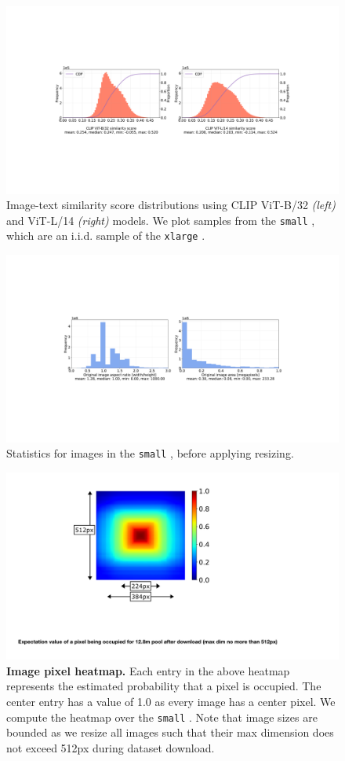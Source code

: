 \begin{figure}
    \centering
    \includegraphics[width=\linewidth]{figures/appx-clip_sim.pdf}
    \caption{Image-text similarity score distributions using CLIP ViT-B/32 \emph{(left)} and ViT-L/14 \emph{(right)} models. We plot samples from the \texttt{small} \pool, which are an i.i.d. sample of the \texttt{xlarge} \pool.}
    \label{fig:clip_sim}
\end{figure}

\begin{figure}
    \centering
    \includegraphics[width=\linewidth]{figures/appx-image_statistics.pdf}
    \caption{Statistics for images in the \texttt{small} \pool, before applying resizing.}
    \label{fig:image_stats}
\end{figure}


\begin{figure}
    \centering
    \includegraphics[width=0.4\linewidth]{figures/appx-img_distrib.pdf}
    \caption{\textbf{Image pixel heatmap.} Each entry in the above heatmap represents the estimated probability that a pixel is occupied. The center entry has a value of 1.0 as every image has a center pixel. We compute the heatmap over the {\small \texttt{small}} \pool. Note that image sizes are bounded as we resize all images such that their max dimension does not exceed 512px during dataset download.}
    \label{fig:resize_distrib}
\end{figure}

